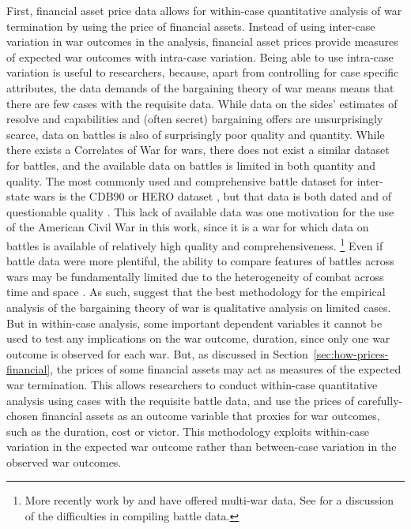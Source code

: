 First, financial asset price data allows for within-case quantitative analysis of war termination by using the price of financial assets.
Instead of using inter-case variation in war outcomes in the analysis, financial asset prices provide measures of expected war outcomes with intra-case variation.
Being able to use intra-case variation is useful to researchers, because, apart from controlling for case specific attributes, the data demands of the bargaining theory of war means means that there are few cases with the requisite data.
While data on the sides' estimates of resolve and capabilities and (often secret) bargaining offers are unsurprisingly scarce, data on battles is also of surprisingly poor quality and quantity.
While there exists a Correlates of War for wars, there does not exist a similar dataset for battles, and the available data on battles is limited in both quantity and quality.
The most commonly used and comprehensive battle dataset for inter-state wars is the CDB90 or HERO dataset \parencites{HistoricalResearchEtAl1984}{cdb90}, but that data is both dated and of questionable quality \parencites[32]{Reiter2003}{BiddleLong2004}.
This lack of available data was one motivation for the use of the American Civil War in this work, since it is a war for which data on battles is available of relatively high quality and comprehensiveness.
\footnote{
More recently work by \textcite{Weisiger2015} and \textcite{CochranLong2014} have offered multi-war data.
See \textcites{cdb90}{Helmbold1995} for a discussion of the difficulties in compiling battle data.
}
Even if battle data were more plentiful, the ability to compare features of battles across wars may be fundamentally limited due to the heterogeneity of combat across time and space \parencite{Reiter2009}.
As such, \textcites{Reiter2003}{Reiter2009} suggest that the best methodology for the empirical analysis of the bargaining theory of war is qualitative analysis on limited cases.
But in within-case analysis, some important dependent variables it cannot be used to test any implications on the war outcome, \eg{}duration, since only one war outcome is observed for each war.
But, as discussed in Section~\ref{sec:how-prices-financial}, the prices of some financial assets may act as measures of the expected war termination.
This allows researchers to conduct within-case quantitative analysis using cases with the requisite battle data, and use the prices of carefully-chosen financial assets as an outcome variable that proxies for war outcomes, such as the duration, cost or victor.
This methodology exploits within-case variation in the expected war outcome rather than between-case variation in the observed war outcomes.

